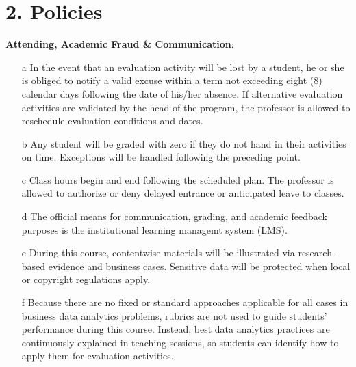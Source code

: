 \documentclass[letterpaper,11pt]{article}
\begin{document}
\section{2. Policies}
\textbf{Attending, Academic Fraud \& Communication}:
\begin{itemize}
\item[a] In the event that an evaluation activity will be lost by a student, he or she is obliged to notify a valid excuse within a term not exceeding eight (8) calendar days following the date of his/her absence. If alternative evaluation activities are validated by the head of the program, the professor is allowed to reschedule evaluation conditions and dates.
\item[b] Any student will be graded with zero if they do not hand in their activities on time. Exceptions will be handled following the preceding point.
\item[c] Class hours begin and end following the scheduled plan. The professor is allowed to authorize or deny delayed entrance or anticipated leave to classes.
\item[d] The official means for communication, grading, and academic feedback purposes is the institutional learning managemt system (LMS).
\item[e] During this course, contentwise materials will be illustrated via research-based evidence and business cases. Sensitive data will be protected when local or copyright regulations apply.
\item[f] Because there are no fixed or standard approaches applicable for all cases in business data analytics problems, rubrics are not used to guide students' performance during this course. Instead, best data analytics practices are continuously explained in teaching sessions, so students can identify how to apply them for evaluation activities. 
\end{itemize}
\end{document}
